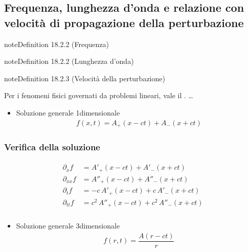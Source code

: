\documentclass[letterpaper,10pt,italian]{jupyterBook}
\begin{document}
\subsection{Frequenza, lunghezza d’onda e relazione con velocità di propagazione della perturbazione}
\label{\detokenize{ch/waves/intro:frequenza-lunghezza-d-onda-e-relazione-con-velocita-di-propagazione-della-perturbazione}}\label{ch/waves/intro:wave-length}
\begin{sphinxadmonition}{note}{Definition 18.2.2 (Frequenza)}


\end{sphinxadmonition}
\label{ch/waves/intro:wave-length}
\begin{sphinxadmonition}{note}{Definition 18.2.2 (Lunghezza d’onda)}


\end{sphinxadmonition}
\label{ch/waves/intro:wave-speed}
\begin{sphinxadmonition}{note}{Definition 18.2.3 (Velocità della perturbazione)}


\end{sphinxadmonition}

\sphinxAtStartPar
Per i fenomeni fisici governati da problemi lineari, vale il . …
\begin{itemize}
\item {} 
\sphinxAtStartPar
Soluzione generale 1\sphinxhyphen{}dimensionale
\begin{equation*}
\begin{split}f(x,t) = A_{+}(x - c t) + A_{-}(x + ct)\end{split}
\end{equation*}
\end{itemize}
\subsubsection*{Verifica della soluzione}
\begin{equation*}
\begin{split}\begin{aligned}
\partial_x    f & = A'_+(x-ct) + A'_-(x+ct) \\
\partial_{xx} f & = A''_+(x-ct) + A''_-(x+ct) \\
\partial_t    f & = - c \, A'_+(x-ct) + c \, A'_-(x+ct) \\
\partial_{tt} f & = c^2 \, A''_+(x-ct) + c^2 \,  A''_-(x+ct) \\
\end{aligned}\end{split}
\end{equation*}\begin{itemize}
\item {} 
\sphinxAtStartPar
Soluzione generale 3\sphinxhyphen{}dimensionale
\begin{equation*}
\begin{split}f(r,t) = \dfrac{A(r-ct)}{r}\end{split}
\end{equation*}
\end{itemize}
\end{document}
